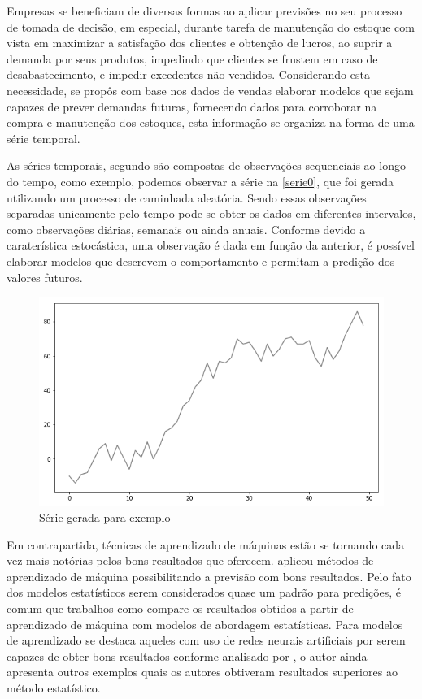 \documentclass[
    12pt,
    oneside,
    a4paper,
    english,
    brazil
]{abntex2}
\begin{document}
Empresas se beneficiam de diversas formas ao aplicar previsões no seu processo 
de tomada de decisão, em especial, durante tarefa de manutenção do estoque com 
vista em maximizar a satisfação dos clientes e obtenção de lucros, ao suprir a 
demanda por seus produtos, impedindo que clientes se frustem em caso de 
desabastecimento, e impedir excedentes não vendidos. Considerando esta 
necessidade, se propôs com base nos dados de vendas elaborar modelos que sejam 
capazes de prever demandas futuras, fornecendo dados para corroborar na compra e 
manutenção dos estoques, esta informação se organiza na forma de uma série 
temporal.

As séries temporais, segundo  são compostas de observações 
sequenciais ao longo do tempo, como exemplo, podemos observar a série na 
\autoref{serie0}, que foi gerada utilizando um processo de caminhada aleatória.  
Sendo essas observações separadas unicamente pelo tempo pode-se obter os dados 
em diferentes intervalos, como observações diárias, semanais ou ainda anuais.  
Conforme  devido a caraterística estocástica, uma observação 
é dada em função da anterior, é possível elaborar modelos que descrevem o 
comportamento e permitam a predição dos valores futuros.

\begin{figure}[ht]
    \centering
    \caption{Série gerada para exemplo}\label{serie0}
    \includegraphics[width=.6\linewidth]{images/serie_exemplo.png}
\end{figure}


Em contrapartida, técnicas de aprendizado de máquinas estão se tornando cada vez 
mais notórias pelos bons resultados que oferecem.  aplicou 
métodos de aprendizado de máquina possibilitando a previsão com bons resultados.  
Pelo fato dos modelos estatísticos serem considerados quase um padrão para 
predições, é comum que trabalhos como  compare os 
resultados obtidos a partir de aprendizado de máquina com modelos de abordagem 
estatísticas. Para modelos de aprendizado se destaca aqueles com uso de redes 
neurais artificiais por serem capazes de obter bons resultados conforme 
analisado por , o autor ainda apresenta outros exemplos quais 
os autores obtiveram resultados superiores ao método estatístico.
\end{document}
